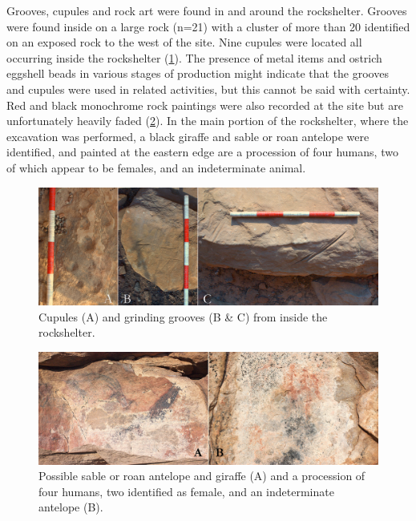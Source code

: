 Grooves, cupules and  rock art were found in and around the rockshelter. Grooves were found inside on a large rock (n=21) with a cluster of more than 20 identified on an exposed rock to the west of the site. 
Nine cupules were located all occurring inside the rockshelter (\cref{fig:Forssman-Figure13}). 
The presence of metal items and ostrich eggshell beads in various stages of production might indicate that 
the grooves and cupules were used in related activities, but this cannot be said with certainty. 
Red and black monochrome rock paintings were also recorded at the site but are unfortunately heavily faded (\cref{fig:Forssman-Figure14}).
In the main portion of the rockshelter, where the excavation was performed, a black giraffe and sable or roan antelope were identified, and painted at the eastern edge are a procession of four humans, two of which appear to be females, and an indeterminate animal. 

	\begin{figure} %
		\includegraphics[width=\linewidth]{figures/Forssman-Figure13}
		\caption{Cupules (A) and grinding grooves (B \& C) from inside the rockshelter.}
		\label{fig:Forssman-Figure13}
	\end{figure}
	
	\begin{figure} %
		\includegraphics[width=\linewidth]{figures/Forssman-Figure14}
		\caption{Possible sable or roan antelope and giraffe (A) and a procession of four humans, two identified as female, and an indeterminate antelope (B).}
		\label{fig:Forssman-Figure14}
	\end{figure}

